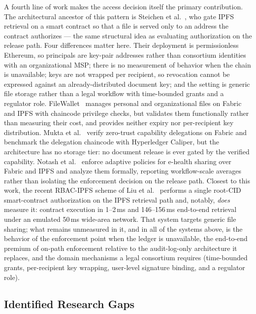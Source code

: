 \documentclass[preprint,12pt]{elsarticle}
\begin{document}
A fourth line of work makes the access decision itself the primary
contribution. The architectural ancestor of this pattern is Steichen et
al.~\cite{steichen2018blockchain}, who gate IPFS retrieval on a smart
contract so that a file is served only to an address the contract
authorizes --- the same structural idea as evaluating authorization on the
release path. Four differences matter here. Their deployment is
permissionless Ethereum, so principals are key-pair addresses rather than
consortium identities with an organizational MSP; there is no measurement of
behavior when the chain is unavailable; keys are not wrapped per recipient,
so revocation cannot be expressed against an already-distributed document
key; and the setting is generic file storage rather than a legal workflow
with time-bounded grants and a regulator role.
FileWallet~\cite{chen2022filewallet} manages personal and
organizational files on Fabric and IPFS with chaincode privilege checks,
but validates them functionally rather than measuring their cost, and
provides neither expiry nor per-recipient key distribution. Mukta et
al.~\cite{mukta2026zerotrust} verify zero-trust capability delegations
on Fabric and benchmark the delegation chaincode with Hyperledger
Caliper, but the architecture has no storage tier: no document release
is ever gated by the verified capability. Notash et
al.~\cite{notash2026adaptive} enforce adaptive policies for e-health
sharing over Fabric and IPFS and analyze them formally, reporting
workflow-scale averages rather than isolating the enforcement decision
on the release path. Closest to this work, the recent RBAC-IPFS scheme
of Liu et al.~\cite{liu2026rbacipfs} performs a single root-CID
smart-contract authorization on the IPFS retrieval path and, notably,
\emph{does} measure it: contract execution in 1--2\,ms and 146--156\,ms
end-to-end retrieval under an emulated 50\,ms wide-area network. That
system targets generic file sharing; what remains unmeasured in it, and
in all of the systems above, is the behavior of the enforcement point
when the ledger is unavailable, the end-to-end premium of on-path
enforcement relative to the audit-log-only architecture it replaces,
and the domain mechanisms a legal consortium requires (time-bounded
grants, per-recipient key wrapping, user-level signature binding, and a
regulator role).

\subsection{Identified Research Gaps}
\label{sec:gaps}
\end{document}
